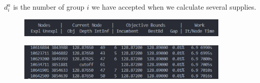 $d_{i}^{a}$ is the number of group $i$ we have accepted when we calculate several supplies.

\begin{figure}[h]
	\centering  
	\includegraphics[width = 0.9\textwidth]{Figures/IP1.png}  %
	\caption{}  %
	\label{fig:IP1}   %
\end{figure}

\begin{figure}[h]
	\centering  
	\includegraphics[width = 0.9\textwidth]{Figures/IP2.png}  %
	\caption{}  %
	\label{fig:IP2}   %
\end{figure}

